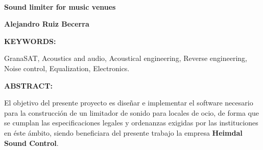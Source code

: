 \newpage

~

\vspace{-1.15cm}


\begin{otherlanguage}{english}

\begin{center}
\textbf{\Large Sound limiter for music venues}
\par\end{center}{\Large \par}

\begin{center}
\textbf{\large Alejandro Ruiz Becerra}
\par\end{center}{\large \par}

\vspace{0.75cm}
\begin{doublespace}
\noindent \textbf{KEYWORDS:}
\end{doublespace}

\begin{singlespace}

    \noindent GranaSAT, Acoustics and audio, Acoustical engineering, Reverse engineering, Noise control, Equalization, Electronics.


\end{singlespace}

\begin{doublespace}
\noindent \textbf{ABSTRACT:}
\end{doublespace}

\begin{singlespace}

%
    \noindent El objetivo del presente proyecto es diseñar e implementar el software necesario para la construcción de un limitador de sonido para locales de ocio, de forma que se cumplan las especificaciones legales y ordenanzas exigidas por las instituciones en éste ámbito, siendo beneficiara del presente trabajo la empresa \textbf{Heimdal Sound Control}.


\end{singlespace}
\end{otherlanguage}
